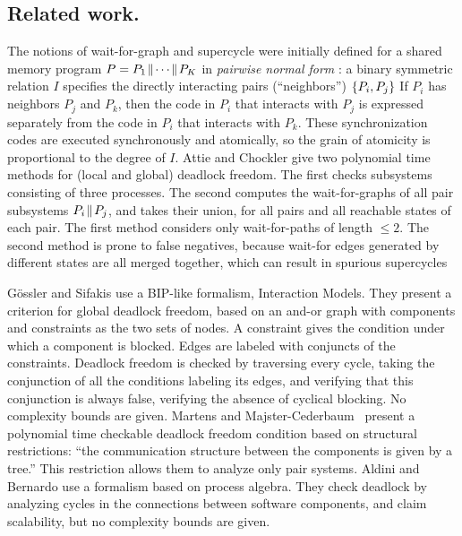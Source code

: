 
\subsection{Related work.} 
The notions of wait-for-graph and supercycle \cite{AC05,AE98}
were initially defined for a shared memory program
$P = P_1 \!\parallel\! \cdots \!\parallel\! P_K$ in \emph{pairwise normal form} \cite{Att16a, Att16b}: a binary
symmetric relation $I$ specifies the directly interacting pairs
(``neighbors'') $\{ P_i, P_j \}$ 
If $P_i$ has neighbors $P_j$ and $P_k$, then 
the code in $P_i$ that interacts with $P_j$ is expressed separately from
the code in $P_i$ that interacts with $P_k$. 
These synchronization codes are executed synchronously and
atomically, so the grain of atomicity is proportional to the
degree of $I$.
%
Attie and Chockler \cite{AC05} give two polynomial time 
methods for (local and global) deadlock freedom.
The first checks subsystems consisting of three
processes. The second computes the wait-for-graphs of all pair subsystems $P_i \!\parallel\! P_j$,
and takes their union, for all pairs
and all reachable states of each pair.
The first method considers only wait-for-paths of length $\le 2$. 
The second method is prone to false negatives,
because wait-for edges generated by different states are
all merged together, which can result in spurious supercycles


G{\"o}ssler and Sifakis \cite{GS03} use a BIP-like
formalism, Interaction Models. %
They present a criterion for global deadlock freedom, based on 
an and-or graph with components and constraints as the two sets of nodes. A
constraint gives the condition
under which a component is blocked. Edges are labeled with conjuncts
of the constraints.  Deadlock freedom is checked by traversing every
cycle, taking the conjunction of all the
conditions labeling its edges, and verifying that this conjunction is
always false, \ie verifying the absence of cyclical blocking.
No complexity bounds are given.
%
Martens and Majster-Cederbaum~\cite{MM12} present a polynomial time
checkable deadlock freedom condition based on structural restrictions:
``the communication structure between the components is given by a
tree.'' This restriction allows them to analyze only pair systems.
%
Aldini and Bernardo \cite{AB03} use a 
formalism based on process algebra. They check deadlock by analyzing cycles in
the connections between software components, and claim scalability, but no
complexity bounds are given.

